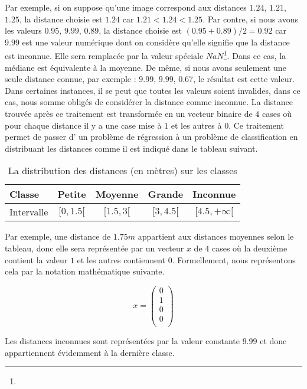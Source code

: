 Par exemple, si on suppose qu'une image correspond aux distances $1.24$, $1.21$, $1.25$, la
distance choisie est $1.24$ car $1.21 < 1.24 < 1.25$. Par contre, si nous avons
les valeurs $0.95$, $9.99$, $0.89$, la distance choisie est $(0.95+0.89)/2 = 0.92$
car $9.99$ est une valeur numérique dont on considère qu'elle signifie que la distance est inconnue.
Elle sera remplacée par la valeur spéciale $NaN$\footnote{}.
Dans ce cas, la médiane est équivalente à la moyenne.
De même, si nous avons seulement une seule distance connue, par exemple :
$9.99$, $9.99$, $0.67$, le résultat est cette valeur. Dans certaines instances,
il se peut que toutes les valeurs soient invalides, dans ce cas, nous somme obligés
de considérer la distance comme inconnue. La distance trouvée après ce traitement
est transformée en un vecteur binaire de $4$ cases où pour chaque distance il
y a une case mise à $1$ et les autres à $0$. Ce traitement permet de passer d'
un problème de régression à un problème de classification en distribuant
les distances comme il est indiqué dans le tableau suivant.

\begin{table}[h]
  \centering
  \begin{tabular}{|l|c|c|c|c|}
    \hline
    Classe & Petite & Moyenne & Grande & Inconnue \\
    \hline
    Intervalle & $[0,1.5[$ & $[1.5,3[$ & $[3,4.5[$ & $[4.5,+\infty[$ \\
    \hline
  \end{tabular}
  \caption{La distribution des distances (en mètres) sur les classes}
\end{table}

Par exemple, une distance de $1.75m$ appartient aux distances moyennes
selon le tableau, donc elle sera représentée par un vecteur $x$ de $4$ cases
où la deuxième contient la valeur $1$ et les autres contiennent $0$. Formellement,
nous représentons cela par la notation mathématique suivante.

$$ x =
\begin{pmatrix}
  0\\
  1\\
  0\\
  0\\
\end{pmatrix}
$$

Les distances inconnues sont représentées par la valeur constante $9.99$ et donc
appartiennent évidemment à la dernière classe.

